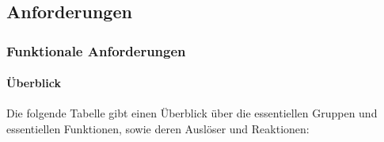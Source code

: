 \documentclass[]{article}
\let\oldparagraph\paragraph
\renewcommand{\paragraph}[1]{\oldparagraph{#1}\mbox{}}
\begin{document}
\hypertarget{anforderungen}{%
\subsection{Anforderungen}\label{anforderungen}}

\hypertarget{funktionale-anforderungen}{%
\subsubsection{Funktionale
Anforderungen}\label{funktionale-anforderungen}}

\hypertarget{uxfcberblick}{%
\paragraph{Überblick}\label{uxfcberblick}}

Die folgende Tabelle gibt einen Überblick über die essentiellen Gruppen
und essentiellen Funktionen, sowie deren Auslöser und Reaktionen:
\end{document}
